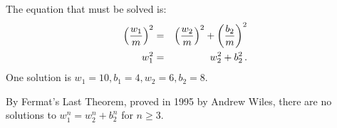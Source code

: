 \solution{}

 The equation that must be solved is:
\begin{eqnarray*}
\left(\displaystyle\frac{w_1}{m}\right)^2&=&\left(\displaystyle\frac{w_2}{m}\right)^2+\left(\displaystyle\frac{b_2}{m}\right)^2\\
w_1^2&=&w_2^2+b_2^2\,.
\end{eqnarray*}
One solution is $w_1=10,b_1=4,w_2=6,b_2=8$.

 By Fermat's Last Theorem, proved in 1995 by Andrew Wiles, there are no solutions to $w_1^n=w_2^n+b_2^n$ for $n\geq 3$.


